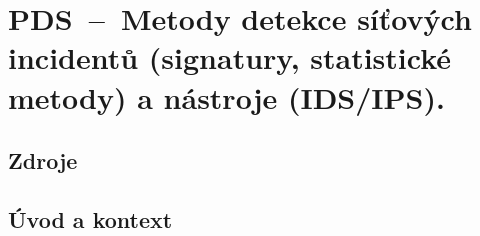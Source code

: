 

\graphicspath{{pds/detekce_sitovych_incidentu/figures}}


\chapter{PDS~--~Metody detekce síťových incidentů (signatury, statistické metody) a nástroje (IDS/IPS).}



\section{Zdroje}

\begin{compactitem}
    \item {}
    \item {}
    \item {}
    \item {}
\end{compactitem}


\section{Úvod a kontext}

